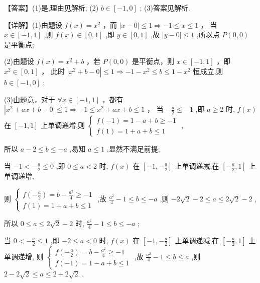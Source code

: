 \documentclass[10pt]{article}
\begin{document}
【答案】(1)是,理由见解析; (2) \(b \in  \left\lbrack  {-1,0}\right\rbrack\) ; (3)答案见解析.

【详解】(1)由题设 \(f\left( x\right)  = {x}^{2}\) ，而 \(\left| {x - 0}\right|  \leq  1 \Rightarrow   - 1 \leq  x \leq  1\) ， 当 \(x \in  \left\lbrack  {-1,1}\right\rbrack\) ,则 \(f\left( x\right)  \in  \left\lbrack  {0,1}\right\rbrack\) ,即 \(y \in  \left\lbrack  {0,1}\right\rbrack\) ,故 \(\left| {y - 0}\right|  \leq  1\) ,所以点 \(P\left( {0,0}\right)\) 是平衡点;

(2)由题设 \(f\left( x\right)  = {x}^{2} + b\) ，若 \(P\left( {0,0}\right)\) 是平衡点，则 \(x \in  \left\lbrack  {-1,1}\right\rbrack\) ，即 \({x}^{2} \in  \left\lbrack  {0,1}\right\rbrack\) ， 此时 \(\left| {{x}^{2} + b - 0}\right|  \leq  1 \Rightarrow   - 1 - {x}^{2} \leq  b \leq  1 - {x}^{2}\) 恒成立,则 \(b \in  \left\lbrack  {-1,0}\right\rbrack\) ;

(3)由题意，对于 \(\forall x \in  \left\lbrack  {-1,1}\right\rbrack\) ，都有 \(\left| {{x}^{2} + {ax} + b - 0}\right|  \leq  1 \Rightarrow   - 1 \leq  {x}^{2} + {ax} + b \leq  1\) ， 当 \(- \frac{a}{2} \leq   - 1\) ,即 \(a \geq  2\) 时, \(f\left( x\right)\) 在 \(\left\lbrack  {-1,1}\right\rbrack\) 上单调递增,则 \(\left\{  \begin{array}{l} f\left( {-1}\right)  = 1 - a + b \geq   - 1 \\  f\left( 1\right)  = 1 + a + b \leq  1 \end{array}\right.\) ,

所以 \(a - 2 \leq  b \leq   - a\) ,易知 \(a \leq  1\) ,显然不满足前提;

当 \(- 1 <  - \frac{a}{2} \leq  0\) ,即 \(0 \leq  a < 2\) 时, \(f\left( x\right)\) 在 \(\left\lbrack  {-1, - \frac{a}{2}}\right\rbrack\) 上单调递减,在 \(\left\lbrack  {-\frac{a}{2},1}\right\rbrack\) 上单调递增,

则 \(\left\{  \begin{array}{l} f\left( {-\frac{a}{2}}\right)  = b - \frac{{a}^{2}}{4} \geq   - 1 \\  f\left( 1\right)  = 1 + a + b \leq  1 \end{array}\right.\) ,故 \(\frac{{a}^{2}}{4} - 1 \leq  b \leq   - a\) ,则 \(- 2\sqrt{2} - 2 \leq  a \leq  2\sqrt{2} - 2\) ,

所以 \(0 \leq  a \leq  2\sqrt{2} - 2\) 时, \(\frac{{a}^{2}}{4} - 1 \leq  b \leq   - a\) ;

当 \(0 <  - \frac{a}{2} \leq  1\) ,即 \(- 2 \leq  a < 0\) 时, \(f\left( x\right)\) 在 \(\left\lbrack  {-1, - \frac{a}{2}}\right\rbrack\) 上单调递减,在 \(\left\lbrack  {-\frac{a}{2},1}\right\rbrack\) 上单调递增, 则 \(\left\{  \begin{array}{l} f\left( {-\frac{a}{2}}\right)  = b - \frac{{a}^{2}}{4} \geq   - 1 \\  f\left( {-1}\right)  = 1 - a + b \leq  1 \end{array}\right.\) ,故 \(\frac{{a}^{2}}{4} - 1 \leq  b \leq  a\) ,则 \(2 - 2\sqrt{2} \leq  a \leq  2 + 2\sqrt{2}\) ,
\end{document}
